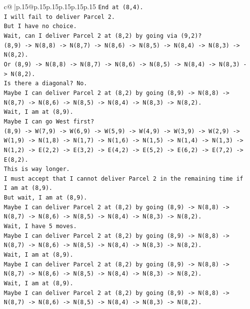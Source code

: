 \documentclass{article}
\begin{document}
{\begin{supertabular}{c@{$\;$}|p{.15\linewidth}@{}p{.15\linewidth}p{.15\linewidth}p{.15\linewidth}p{.15\linewidth}p{.15\linewidth}}
{{{\texttt{End at (8,4).} \\
\texttt{I will fail to deliver Parcel 2.} \\
\texttt{But I have no choice.} \\
\texttt{Wait, can I deliver Parcel 2 at (8,2) by going via (9,2)?} \\
\texttt{(8,9) {-}> N(8,8) {-}> N(8,7) {-}> N(8,6) {-}> N(8,5) {-}> N(8,4) {-}> N(8,3) {-}> N(8,2).} \\
\texttt{Or (8,9) {-}> N(8,8) {-}> N(8,7) {-}> N(8,6) {-}> N(8,5) {-}> N(8,4) {-}> N(8,3) {-}> N(8,2).} \\
\texttt{Is there a diagonal? No.} \\
\texttt{Maybe I can deliver Parcel 2 at (8,2) by going (8,9) {-}> N(8,8) {-}> N(8,7) {-}> N(8,6) {-}> N(8,5) {-}> N(8,4) {-}> N(8,3) {-}> N(8,2).} \\
\texttt{Wait, I am at (8,9).} \\
\texttt{Maybe I can go West first?} \\
\texttt{(8,9) {-}> W(7,9) {-}> W(6,9) {-}> W(5,9) {-}> W(4,9) {-}> W(3,9) {-}> W(2,9) {-}> W(1,9) {-}> N(1,8) {-}> N(1,7) {-}> N(1,6) {-}> N(1,5) {-}> N(1,4) {-}> N(1,3) {-}> N(1,2) {-}> E(2,2) {-}> E(3,2) {-}> E(4,2) {-}> E(5,2) {-}> E(6,2) {-}> E(7,2) {-}> E(8,2).} \\
\texttt{This is way longer.} \\
\texttt{I must accept that I cannot deliver Parcel 2 in the remaining time if I am at (8,9).} \\
\texttt{But wait, I am at (8,9).} \\
\texttt{Maybe I can deliver Parcel 2 at (8,2) by going (8,9) {-}> N(8,8) {-}> N(8,7) {-}> N(8,6) {-}> N(8,5) {-}> N(8,4) {-}> N(8,3) {-}> N(8,2).} \\
\texttt{Wait, I have 5 moves.} \\
\texttt{Maybe I can deliver Parcel 2 at (8,2) by going (8,9) {-}> N(8,8) {-}> N(8,7) {-}> N(8,6) {-}> N(8,5) {-}> N(8,4) {-}> N(8,3) {-}> N(8,2).} \\
\texttt{Wait, I am at (8,9).} \\
\texttt{Maybe I can deliver Parcel 2 at (8,2) by going (8,9) {-}> N(8,8) {-}> N(8,7) {-}> N(8,6) {-}> N(8,5) {-}> N(8,4) {-}> N(8,3) {-}> N(8,2).} \\
\texttt{Wait, I am at (8,9).} \\
\texttt{Maybe I can deliver Parcel 2 at (8,2) by going (8,9) {-}> N(8,8) {-}> N(8,7) {-}> N(8,6) {-}> N(8,5) {-}> N(8,4) {-}> N(8,3) {-}> N(8,2).} \\
}}}
\end{supertabular}}
\end{document}

